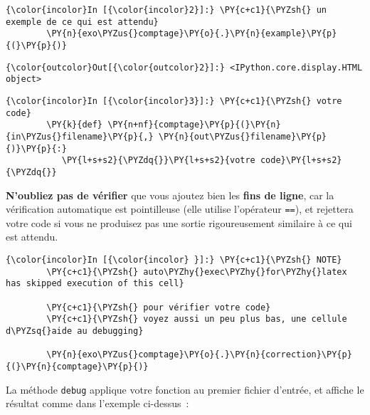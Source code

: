     \begin{Verbatim}[commandchars=\\\{\},frame=single,framerule=0.3mm,rulecolor=\color{cellframecolor}]
{\color{incolor}In [{\color{incolor}2}]:} \PY{c+c1}{\PYZsh{} un exemple de ce qui est attendu}
        \PY{n}{exo\PYZus{}comptage}\PY{o}{.}\PY{n}{example}\PY{p}{(}\PY{p}{)}
\end{Verbatim}


\begin{Verbatim}[commandchars=\\\{\},frame=single,framerule=0.3mm,rulecolor=\color{cellframecolor}]
{\color{outcolor}Out[{\color{outcolor}2}]:} <IPython.core.display.HTML object>
\end{Verbatim}
            
    \begin{Verbatim}[commandchars=\\\{\},frame=single,framerule=0.3mm,rulecolor=\color{cellframecolor}]
{\color{incolor}In [{\color{incolor}3}]:} \PY{c+c1}{\PYZsh{} votre code}
        \PY{k}{def} \PY{n+nf}{comptage}\PY{p}{(}\PY{n}{in\PYZus{}filename}\PY{p}{,} \PY{n}{out\PYZus{}filename}\PY{p}{)}\PY{p}{:}
           \PY{l+s+s2}{\PYZdq{}}\PY{l+s+s2}{votre code}\PY{l+s+s2}{\PYZdq{}}
\end{Verbatim}


    \textbf{N'oubliez pas de vérifier} que vous ajoutez bien les
\textbf{fins de ligne}, car la vérification automatique est pointilleuse
(elle utilise l'opérateur \texttt{==}), et rejettera votre code si vous
ne produisez pas une sortie rigoureusement similaire à ce qui est
attendu.

    \begin{Verbatim}[commandchars=\\\{\},frame=single,framerule=0.3mm,rulecolor=\color{cellframecolor}]
{\color{incolor}In [{\color{incolor} }]:} \PY{c+c1}{\PYZsh{} NOTE}
        \PY{c+c1}{\PYZsh{} auto\PYZhy{}exec\PYZhy{}for\PYZhy{}latex has skipped execution of this cell}
        
        \PY{c+c1}{\PYZsh{} pour vérifier votre code}
        \PY{c+c1}{\PYZsh{} voyez aussi un peu plus bas, une cellule d\PYZsq{}aide au debugging}
        
        \PY{n}{exo\PYZus{}comptage}\PY{o}{.}\PY{n}{correction}\PY{p}{(}\PY{n}{comptage}\PY{p}{)}
\end{Verbatim}


    La méthode \texttt{debug} applique votre fonction au premier fichier
d'entrée, et affiche le résultat comme dans l'exemple ci-dessus~:

